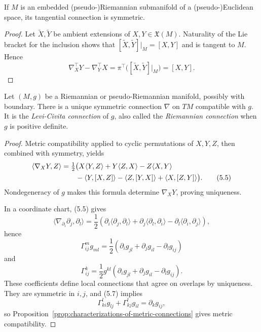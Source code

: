 \begin{proposition}
\label{prop:tangential-connection-symmetric}

If $M$ is an embedded (pseudo-)Riemannian submanifold of a
(pseudo-)Euclidean space, its tangential connection is symmetric.

\begin{proof}
\sketch Let $\widetilde X,\widetilde Y$ be ambient extensions of
$X,Y\in\mathfrak X(M)$. Naturality of the Lie bracket for the inclusion shows
that $[\widetilde X,\widetilde Y]|_M=[X,Y]$ and is tangent to $M$. Hence
\[
\nabla_X^\top Y-\nabla_Y^\top X
=\pi^\top\bigl([\widetilde X,\widetilde Y]|_M\bigr)=[X,Y].
\]
\end{proof}
\end{proposition}

\begin{theorem}
\label{thm:fundamental-theorem-riemannian-geometry}

Let $(M,g)$ be a Riemannian or pseudo-Riemannian manifold, possibly with
boundary. There is a unique symmetric connection $\nabla$ on $TM$ compatible
with $g$. It is the \emph{Levi-Civita connection} of $g$, also called the
\emph{Riemannian connection} when $g$ is positive definite.

\begin{proof}
\sketch Metric compatibility applied to cyclic permutations of $X,Y,Z$, then
combined with symmetry, yields
\begin{align}
\langle\nabla_XY,Z\rangle
&=\tfrac12\bigl(X\langle Y,Z\rangle+Y\langle Z,X\rangle-Z\langle X,Y\rangle
\notag\\
&\qquad-\langle Y,[X,Z]\rangle-\langle Z,[Y,X]\rangle
+\langle X,[Z,Y]\rangle\bigr).
\tag{5.5}
\end{align}
Nondegeneracy of $g$ makes this formula determine $\nabla_XY$, proving
uniqueness.

In a coordinate chart, (5.5) gives
\begin{equation}
\langle\nabla_{\partial_i}\partial_j,\partial_l\rangle
=\frac12(\partial_i\langle\partial_j,\partial_l\rangle
+\partial_j\langle\partial_l,\partial_i\rangle
-\partial_l\langle\partial_i,\partial_j\rangle),
\tag{5.6}
\end{equation}
hence
\begin{equation}
\Gamma^m_{ij}g_{ml}
=\frac12(\partial_ig_{jl}+\partial_jg_{il}-\partial_lg_{ij})
\tag{5.7}
\end{equation}
and
\begin{equation}
\Gamma^k_{ij}
=\frac12g^{kl}(\partial_ig_{jl}+\partial_jg_{il}-\partial_lg_{ij}).
\tag{5.8}
\end{equation}
These coefficients define local connections that agree on overlaps by
uniqueness. They are symmetric in $i,j$, and (5.7) implies
\[
\Gamma^l_{ki}g_{lj}+\Gamma^l_{kj}g_{il}=\partial_kg_{ij},
\]
so Proposition~\ref{prop:characterizations-of-metric-connections} gives metric
compatibility.
\end{proof}
\end{theorem}

